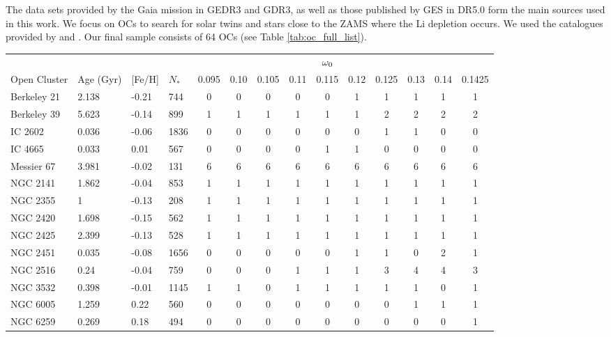 \documentclass[fleqn,usenatbib]{mnras}
\begin{document}
The data sets provided by the Gaia mission in GEDR3 and GDR3, as well as those published by GES in DR5.0 form the main sources used in this work. We focus on OCs to search for solar twins and stars close to the ZAMS where the Li depletion occurs. We used the catalogues provided by \citet{Bragaglia2022} and \citet{Randich2022}. Our final sample consists of 64 OCs (see Table \ref{tab:oc_full_list}). 

\begin{table}
	\centering
	\begin{tabular}{|l l l l || c c c c c c c c c c|} 
		\hline
             & & & & & & & & $\omega_{\mathrm{0}}$ & & & & & \\
		Open Cluster & Age (Gyr) & [Fe/H] & $N_*$ & 0.095 & 0.10 & 0.105 & 0.11 & 0.115 & 0.12 & 0.125 & 0.13 & 0.14 & 0.1425\\
		\hline
            Berkeley 21 & 2.138 & -0.21 & 744 & 0 & 0 & 0 & 0 & 0 & 1 & 1 & 1 & 1 & 1\\
            Berkeley 39 & 5.623 & -0.14 & 899 & 1 & 1 & 1 & 1 & 1 & 1 & 2 & 2 & 2 & 2\\
            IC 2602 & 0.036 & -0.06 & 1836 & 0 & 0 & 0 & 0 & 0 & 0 & 1 & 1 & 0 & 0\\
            IC 4665 & 0.033 & 0.01 & 567 & 0 & 0 & 0 & 0 & 1 & 1 & 0 & 0 & 0 & 0\\
            Messier 67 & 3.981 & -0.02 & 131 & 6 & 6 & 6 & 6 & 6 & 6 & 6 & 6 & 6 & 6\\
            NGC 2141 & 1.862 & -0.04 & 853 & 1 & 1 & 1 & 1 & 1 & 1 & 1 & 1 & 1 & 1\\
            NGC 2355 & 1 & -0.13 & 208 & 1 & 1 & 1 & 1 & 1 & 1 & 1 & 1 & 1 & 1\\
            NGC 2420 & 1.698 & -0.15 & 562 & 1 & 1 & 1 & 1 & 1 & 1 & 1 & 1 & 1 & 1\\
            NGC 2425 & 2.399 & -0.13 & 528 & 1 & 1 & 1 & 1 & 1 & 1 & 1 & 1 & 1 & 1\\
            NGC 2451 & 0.035 & -0.08 & 1656 & 0 & 0 & 0 & 0 & 0 & 1 & 1 & 0 & 2 & 1\\
            NGC 2516 & 0.24 & -0.04 & 759 & 0 & 0 & 0 & 1 & 1 & 1 & 3 & 4 & 4 & 3\\
            NGC 3532 & 0.398 & -0.01 & 1145 & 1 & 1 & 0 & 1 & 1 & 1 & 1 & 1 & 0 & 1\\
            NGC 6005 & 1.259 & 0.22 & 560 & 0 & 0 & 0 & 0 & 0 & 0 & 0 & 1 & 1 & 1\\
            NGC 6259 & 0.269 & 0.18 & 494 & 0 & 0 & 0 & 0 & 0 & 0 & 0 & 0 & 0 & 1\\

\end{tabular}
\end{table}
\end{document}
